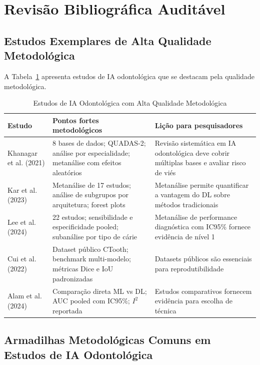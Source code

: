 \section{Revisão Bibliográfica Auditável}

\subsection{Estudos Exemplares de Alta Qualidade Metodológica}

A Tabela~\ref{tab:estudos-exemplares} apresenta estudos de IA odontológica que se destacam pela qualidade metodológica.

\begin{table}[H]
  \centering
  \caption{Estudos de IA Odontológica com Alta Qualidade Metodológica}
  \label{tab:estudos-exemplares}
  \small
  \begin{tabularx}{\textwidth}{p{3cm}XX}
    \toprule
    \textbf{Estudo} & \textbf{Pontos fortes metodológicos} & \textbf{Lição para pesquisadores} \\
    \midrule
    Khanagar et al. (2021) \cite{ODT-001} & 8 bases de dados; QUADAS-2; análise por especialidade; metanálise com efeitos aleatórios & Revisão sistemática em IA odontológica deve cobrir múltiplas bases e avaliar risco de viés \\
    Kar et al. (2023) \cite{ODT-010} & Metanálise de 17 estudos; análise de subgrupos por arquitetura; forest plots & Metanálise permite quantificar a vantagem do DL sobre métodos tradicionais \\
    Lee et al. (2024) \cite{ODT-016} & 22 estudos; sensibilidade e especificidade pooled; subanálise por tipo de cárie & Metanálise de performance diagnóstica com IC95\% fornece evidência de nível 1 \\
    Cui et al. (2022) \cite{ODT-030} & Dataset público CTooth; benchmark multi-modelo; métricas Dice e IoU padronizadas & Datasets públicos são essenciais para reprodutibilidade \\
    Alam et al. (2024) \cite{ODT-015} & Comparação direta ML vs DL; AUC pooled com IC95\%; $I^2$ reportada & Estudos comparativos fornecem evidência para escolha de técnica \\
    \bottomrule
  \end{tabularx}
\end{table}

\subsection{Armadilhas Metodológicas Comuns em Estudos de IA Odontológica}

